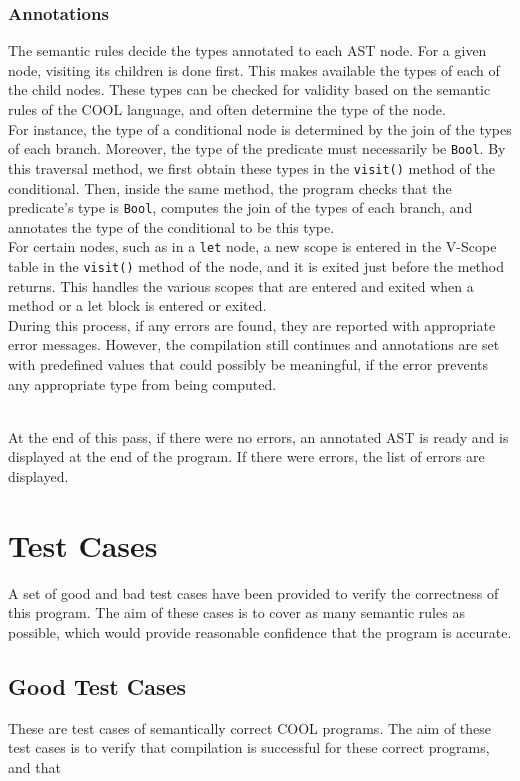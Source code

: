 \documentclass{article}
\begin{document}
\subsubsection*{Annotations}
The semantic rules decide the types annotated to each AST node. For a given node, visiting its children is done first. This makes available the types of each of the child nodes. These types can be checked for validity based on the semantic rules of the COOL language, and often determine the type of the node.
\\
For instance, the type of a conditional node is determined by the join of the types of each branch. Moreover, the type of the predicate must necessarily be \verb|Bool|. By this traversal method, we first obtain these types in the \verb|visit()| method of the conditional. Then, inside the same method, the program checks that the predicate's type is \verb|Bool|, computes the join of the types of each branch, and annotates the type of the conditional to be this type.
\\
For certain nodes, such as in a \verb|let| node, a new scope is entered in the V-Scope table in the \verb|visit()| method of the node, and it is exited just before the method returns. This handles the various scopes that are entered and exited when a method or a let block is entered or exited.
\\
During this process, if any errors are found, they are reported with appropriate error messages. However, the compilation still continues and annotations are set with predefined values that could possibly be meaningful, if the error prevents any appropriate type from being computed.

~\\
At the end of this pass, if there were no errors, an annotated AST is ready and is displayed at the end of the program. If there were errors, the list of errors are displayed.

\section{Test Cases}
A set of good and bad test cases have been provided to verify the correctness of this program. The aim of these cases is to cover as many semantic rules as possible, which would provide reasonable confidence that the program is accurate.

\subsection{Good Test Cases}
These are test cases of semantically correct COOL programs. The aim of these test cases is to verify that compilation is successful for these correct programs, and that 
\end{document}
